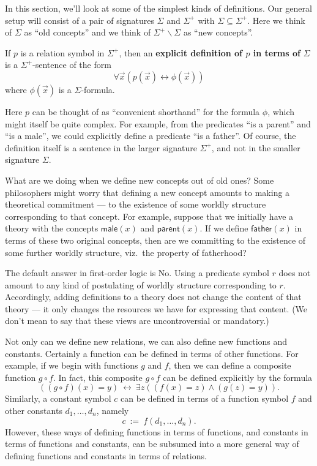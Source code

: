 In this section, we'll look at some of the simplest kinds of
definitions.  Our general setup will consist of a pair of signatures
$\Sigma$ and $\Sigma ^+$ with $\Sigma\subseteq \Sigma ^+$.  Here we
think of $\Sigma$ as ``old concepts'' and we think of
$\Sigma ^+\backslash\Sigma$ as ``new concepts''.
\begin{defn} If $p$ is a relation symbol in $\Sigma ^+$, then an
  \textbf{explicit definition of $p$ in terms of} $\Sigma$ is a
  $\Sigma^+$-sentence of the form
  \[ \forall \vec{x} (p(\vec{x})\leftrightarrow\phi(\vec{x}))
\] 
where $\phi(\vec{x})$ is a $\Sigma$-formula.  \end{defn} Here $p$ can
be thought of as ``convenient shorthand'' for the formula $\phi$,
which might itself be quite complex.  For example, from the predicates
``is a parent'' and ``is a male'', we could explicitly define a
predicate ``is a father''.  Of course, the definition itself is a
sentence in the larger signature $\Sigma ^+$, and not in the smaller
signature $\Sigma$.

\begin{disc} What are we doing when we define new concepts out of old
  ones?  Some philosophers might worry that defining a new concept
  amounts to making a theoretical commitment --- to the existence of
  some worldly structure corresponding to that concept.  For example,
  suppose that we initially have a theory with the concepts
  $\mathsf{male}(x)$ and $\mathsf{parent}(x)$.  If we define
  $\mathsf{father}(x)$ in terms of these two original concepts, then
  are we committing to the existence of some further worldly
  structure, viz.\ the property of fatherhood?

  The default answer in first-order logic is No.  Using a predicate
  symbol $r$ does not amount to any kind of postulating of worldly
  structure corresponding to $r$.  Accordingly, adding definitions to
  a theory does not change the content of that theory --- it only
  changes the resources we have for expressing that content.  (We
  don't mean to say that these views are uncontroversial or
  mandatory.)  \end{disc}

Not only can we define new relations, we can also define new functions
and constants.  Certainly a function can be defined in terms of other
functions.  For example, if we begin with functions $g$ and $f$, then
we can define a composite function $g\circ f$.  In fact, this
composite $g\circ f$ can be defined explicitly by the formula
\[ ((g\circ f)(x) = y)\: \leftrightarrow \: \exists z((f(x)=z)\wedge
  (g(z)=y)) .\]
Similarly, a constant symbol $c$ can be defined in terms of a function
symbol $f$ and other constants $d_1,\dots ,d_n$, namely
\[ c \: := \: f(d_1,\dots ,d_n) .\] However, these ways of defining
functions in terms of functions, and constants in terms of functions
and constants, can be subsumed into a more general way of defining
functions and constants in terms of relations.

